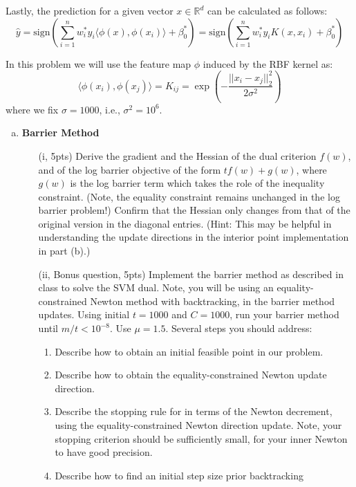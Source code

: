 \documentclass{article}
\theoremstyle{remark}
\theoremstyle{definition}
\def\R{\mathbb{R}}
\def\sign{\mathrm{sign}}
\begin{document}
Lastly, the prediction for a given vector $x\in\R^d$ can be
calculated as follows:
\begin{equation}
  \hat{y} = \sign\left(\sum_{i=1}^n w^*_i y_i \langle \phi(x), \phi(x_i)\rangle + \beta^*_0\right) = \sign\left(\sum_{i=1}^n w^*_i y_i K(x, x_i) + \beta^*_0\right)
\end{equation}

In this problem we will use the feature map $\phi$ induced by the RBF kernel as:
$$\langle \phi(x_i), \phi(x_j) \rangle = K_{ij} = \exp\left(-\frac{||x_i - x_j||_2^2}{2\sigma^2}\right)$$
where we fix $\sigma = 1000$, i.e., $\sigma^2 = 10^6$.

\begin{enumerate}[(a)]

\item \textbf{Barrier Method } 
  \begin{enumerate}[(i)]
  \item[(i, 5pts)] Derive the gradient and the Hessian of the dual criterion $f(w)$, and of
    the log barrier objective of the form $tf(w) + g(w)$, where $g(w)$ is the
    log barrier term which takes the role of the inequality constraint. (Note,
    the equality constraint remains unchanged in the log barrier problem!)
    Confirm that the Hessian only changes from that of the original version in
    the diagonal entries. (Hint: This may be helpful in understanding the update
    directions in the interior point implementation in part (b).)
  \item[(ii, Bonus question, 5pts)] Implement the barrier method as described in
    class to solve the SVM dual. Note, you will be using an equality-constrained
    Newton method with backtracking, in the barrier method updates. Using
    initial $t=1000$ and $C=1000$, run your barrier method until
    $m/t<10^{-8}$. Use $\mu=1.5$. Several steps you should address:
    \begin{enumerate}
      \item Describe how to obtain an initial feasible point in our problem.
      \item Describe how to obtain the equality-constrained Newton update
        direction.
      \item Describe the stopping rule for in terms of the Newton decrement,
        using the equality-constrained Newton direction update. Note, your
        stopping criterion should be sufficiently small, for your inner Newton
        to have good precision.
      \item Describe how to find an initial step size prior backtracking

\end{enumerate}
\end{enumerate}
\end{enumerate}
\end{document}
